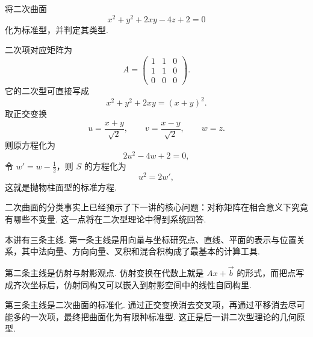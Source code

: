 \begin{example}{}{}
    将二次曲面
    \[
        x^2 + y^2 + 2 x y - 4 z + 2 = 0
    \]
    化为标准型，并判定其类型.
\end{example}

\begin{solution}
    二次项对应矩阵为
    \[
        A =
        \begin{pmatrix}
            1 & 1 & 0 \\
            1 & 1 & 0 \\
            0 & 0 & 0
        \end{pmatrix}.
    \]
    它的二次型可直接写成
    \[
        x^2 + y^2 + 2 x y = (x + y)^2.
    \]
    取正交变换
    \[
        u = \frac{x + y}{\sqrt{2}}, \qquad
        v = \frac{x - y}{\sqrt{2}}, \qquad
        w = z.
    \]
    则原方程化为
    \[
        2 u^2 - 4 w + 2 = 0,
    \]
    令 $w' = w - \frac{1}{2}$，则 $S$ 的方程化为
    \[
    u^2 = 2 w',
    \]
    这就是抛物柱面型的标准方程.
\end{solution}

二次曲面的分类事实上已经预示了下一讲的核心问题：对称矩阵在相合意义下究竟有哪些不变量. 这一点将在二次型理论中得到系统回答.

\begin{summary}
    本讲有三条主线. 第一条主线是用向量与坐标研究点、直线、平面的表示与位置关系，其中法向量、方向向量、叉积和混合积构成了最基本的计算工具.

    第二条主线是仿射与射影观点. 仿射变换在代数上就是 $A x + \vec{b}$ 的形式，而把点写成齐次坐标后，仿射同构又可以嵌入到射影空间中的线性自同构里.

    第三条主线是二次曲面的标准化. 通过正交变换消去交叉项，再通过平移消去尽可能多的一次项，最终把曲面化为有限种标准型. 这正是后一讲二次型理论的几何原型.
\end{summary}

